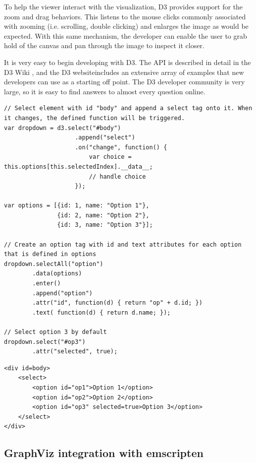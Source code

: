 To help the viewer interact with the visualization, D3 provides support for the zoom and drag behaviors. This listens to the mouse clicks commonly associated with zooming (i.e. scrolling, double clicking) and enlarges the image as would be expected. With this same mechanism, the developer can enable the user to grab hold of the canvas and pan through the image to inspect it closer.

It is very easy to begin developing with D3. The API is described in detail in the D3 Wiki \cite{D3Wiki}, and the D3 website\footnotemark[3] includes an extensive array of examples that new developers can use as a starting off point. The D3 developer community is very large, so it is easy to find answers to almost every question online. 

\lstset{language=Java}
\begin{lstlisting}[caption=Dynamically create a dropdown menu.,label=d3Example]
// Select element with id "body" and append a select tag onto it. When it changes, the defined function will be triggered.
var dropdown = d3.select("#body")
				   	.append("select")
				   	.on("change", function() {
				   		var choice = this.options[this.selectedIndex].__data__;
				   		// handle choice
				   	});

var options = [{id: 1, name: "Option 1"},
			   {id: 2, name: "Option 2"},
			   {id: 3, name: "Option 3"}];

// Create an option tag with id and text attributes for each option that is defined in options
dropdown.selectAll("option")
		.data(options)
		.enter()
		.append("option")
		.attr("id", function(d) { return "op" + d.id; })
		.text( function(d) { return d.name; });

// Select option 3 by default
dropdown.select("#op3")
		.attr("selected", true);
\end{lstlisting} 

\lstset{language=HTML}
\begin{lstlisting}[caption=Html generated from Listing \ref{d3Example},label=d3Result]
<div id=body>
    <select>
        <option id="op1">Option 1</option>
        <option id="op2">Option 2</option>
        <option id="op3" selected=true>Option 3</option>
    </select>
</div>
\end{lstlisting}


\subsection{GraphViz integration with emscripten}

